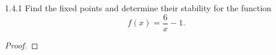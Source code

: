 \begin{problem}{1.4.1}
  Find the fixed points and determine their stability for the function $$f(x) = \frac{6}{x} - 1.$$
\end{problem}

\begin{proof}
\end{proof}
\newpage
